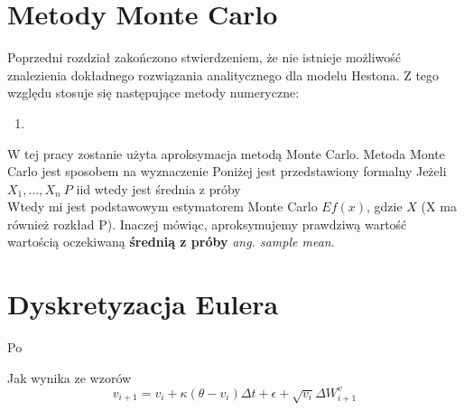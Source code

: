 \documentclass{pracamgr}
\begin{document}






\section{Metody Monte Carlo}

Poprzedni rozdział zakończono stwierdzeniem, że nie istnieje możliwość znalezienia dokładnego rozwiązania analitycznego
dla modelu Hestona. Z tego względu stosuje się następujące metody numeryczne:
\begin{enumerate}
\item 
\end{enumerate}

W tej pracy zostanie użyta aproksymacja metodą Monte Carlo. Metoda Monte Carlo jest sposobem na wyznaczenie 
Poniżej jest przedstawiony formalny 
Jeżeli $X_1, ..., X_n ~P$ iid  wtedy
jest średnia z próby 
\begin{equation}
  
\end{equation}
Wtedy mi jest podstawowym estymatorem Monte Carlo $Ef(x)$, gdzie $X$ (X ma również rozkład P). Inaczej mówiąc, aproksymujemy prawdziwą wartość wartością oczekiwaną \textbf{średnią z próby} \textit{ang. sample mean}.



\section{Dyskretyzacja Eulera}

Po

 Jak wynika ze wzorów  
\begin{equation}\label{h:euler}
v_{i+1}  = v_i + \kappa (\theta - v_i) \Delta t + \epsilon +  \sqrt{v_i} \Delta W^{v}_{i+1}
\end{equation}
  
\end{document}
